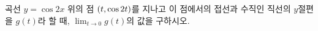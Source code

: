 곡선 $y=\cos 2x$ 위의 점 $(t{,}\mkern3mu\mathopen{}\cos 2t)$를 지나고 이 점에서의 접선과 수직인 직선의 $y$절편을 $g(t)$라 할 때, $\displaystyle\lim_{t\to 0}g(t)$의 값을 구하시오.
